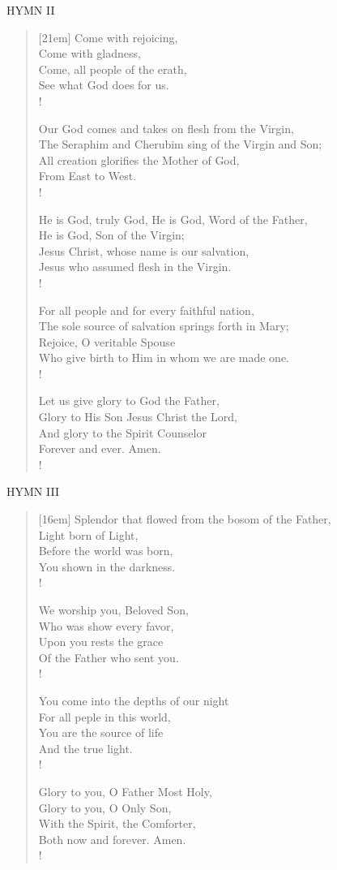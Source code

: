 \small{\uppercase{Hymn II}}\normalsize
\begin{verse}[21em]
Come with rejoicing,\\
Come with gladness,\\
Come, all people of the erath,\\
See what God does for us.\\!

Our God comes and takes on flesh from the Virgin,\\
The Seraphim and Cherubim sing of the Virgin and Son;\\
All creation glorifies the Mother of God,\\
From East to West.\\!

He is God, truly  God, He is God, Word of the Father,\\
He is God, Son of the Virgin;\\
Jesus Christ, whose name is our salvation,\\
Jesus who assumed flesh in the Virgin.\\!

For all people and for every faithful nation,\\
The sole source of salvation springs forth in Mary;\\
Rejoice, O veritable Spouse\\
Who give birth to Him in whom we are made one.\\!

Let us give glory to God the Father,\\
Glory to His Son Jesus Christ the Lord,\\
And glory to the Spirit Counselor\\
Forever and ever. Amen.\\!
\end{verse}

\small{\uppercase{Hymn III}}\normalsize
\begin{verse}[16em]
Splendor that flowed from the bosom of the Father,\\
Light born of Light,\\
Before the world was born,\\
You shown in the darkness.\\!

We worship you, Beloved Son,\\
Who was show every favor,\\
Upon you rests the grace\\
Of the Father who sent you.\\!

You come into the depths of our night\\
For all peple in this world,\\
You are the source of life\\
And the true light.\\!

Glory to you, O Father Most Holy,\\
Glory to you, O Only Son,\\
With the Spirit, the Comforter,\\
Both now and forever. Amen.\\!
\end{verse}

